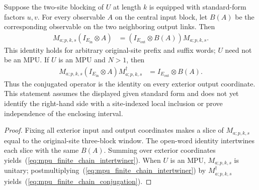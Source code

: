 \begin{lemma}
    \label{thm:mpu_anchored_three_block_operator}
    \leanok
    Suppose the two-site blocking of $U$ at length $k$ is equipped with
    standard-form factors $u,v$. For every observable $A$ on the central
    input block, let $B(A)$ be the corresponding observable on the two
    neighboring output links. Then
    \begin{align}
        M_{a;p,k,s}(I_{E_{\mathrm{in}}}\otimes A)
         & =(I_{E_{\mathrm{out}}}\otimes B(A))M_{a;p,k,s}.
        \label{eq:mpu_finite_chain_intertwiner}
    \end{align}
    This identity holds for arbitrary original-site prefix and suffix
    words; $U$ need not be an MPU. If $U$ is an MPU and $N>1$, then
    \begin{align}
        M_{a;p,k,s}(I_{E_{\mathrm{in}}}\otimes A)M_{a;p,k,s}^{\dagger}
         & =I_{E_{\mathrm{out}}}\otimes B(A).
        \label{eq:mpu_finite_chain_conjugation}
    \end{align}
    Thus the conjugated operator is the identity on every exterior
    output coordinate. This statement assumes the displayed given
    standard form and does not yet identify the right-hand side with
    a site-indexed local inclusion or prove independence of the
    enclosing interval.
\end{lemma}

\begin{proof}\leanok
    Fixing all exterior input and output coordinates makes a slice of
    $M_{a;p,k,s}$ equal to the original-site three-block window.
    The open-word identity intertwines each slice with the same $B(A)$.
    Summing over exterior coordinates yields~(\ref{eq:mpu_finite_chain_intertwiner}).
    When $U$ is an MPU, $M_{a;p,k,s}$ is unitary; postmultiplying~(\ref{eq:mpu_finite_chain_intertwiner}) by $M_{a;p,k,s}^\dagger$ yields~(\ref{eq:mpu_finite_chain_conjugation}).
\end{proof}

